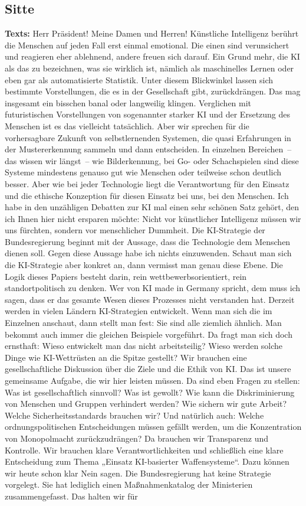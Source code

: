 \documentclass{article}
\begin{document}
\subsection{Sitte}
\noindent\textbf{Texts:} Herr Präsident! Meine Damen und Herren! Künstliche Intelligenz berührt die Menschen auf jeden Fall erst einmal emotional. Die einen sind verunsichert und reagieren eher ablehnend, andere freuen sich darauf. Ein Grund mehr, die KI als das zu bezeichnen, was sie wirklich ist, nämlich als maschinelles Lernen oder eben gar als automatisierte Statistik. Unter diesem Blickwinkel lassen sich bestimmte Vorstellungen, die es in der Gesellschaft gibt, zurückdrängen. Das mag insgesamt ein bisschen banal oder langweilig klingen. Verglichen mit futuristischen Vorstellungen von sogenannter starker KI und der Ersetzung des Menschen ist es das vielleicht tatsächlich. Aber wir sprechen für die vorhersagbare Zukunft von selbstlernenden Systemen, die quasi Erfahrungen in der Mustererkennung sammeln und dann entscheiden. In einzelnen Bereichen – das wissen wir längst – wie Bilderkennung, bei Go- oder Schachspielen sind diese Systeme mindestens genauso gut wie Menschen oder teilweise schon deutlich besser. Aber wie bei jeder Technologie liegt die Verantwortung für den Einsatz und die ethische Konzeption für diesen Einsatz bei uns, bei den Menschen.  Ich habe in den unzähligen Debatten zur KI mal einen sehr schönen Satz gehört, den ich Ihnen hier nicht ersparen möchte: Nicht vor künstlicher Intelligenz müssen wir uns fürchten, sondern vor menschlicher Dummheit.  Die KI-Strategie der Bundesregierung beginnt mit der Aussage, dass die Technologie dem Menschen dienen soll. Gegen diese Aussage habe ich nichts einzuwenden. Schaut man sich die KI-Strategie aber konkret an, dann vermisst man genau diese Ebene. Die Logik dieses Papiers besteht darin, rein wettbewerbsorientiert, rein standortpolitisch zu denken. Wer von KI made in Germany spricht, dem muss ich sagen, dass er das gesamte Wesen dieses Prozesses nicht verstanden hat.  Derzeit werden in vielen Ländern KI-Strategien entwickelt. Wenn man sich die im Einzelnen anschaut, dann stellt man fest: Sie sind alle ziemlich ähnlich. Man bekommt auch immer die gleichen Beispiele vorgeführt. Da fragt man sich doch ernsthaft: Wieso entwickelt man das nicht arbeitsteilig? Wieso werden solche Dinge wie KI-Wettrüsten an die Spitze gestellt? Wir brauchen eine gesellschaftliche Diskussion über die Ziele und die Ethik von KI. Das ist unsere gemeinsame Aufgabe, die wir hier leisten müssen. Da sind eben Fragen zu stellen: Was ist gesellschaftlich sinnvoll? Was ist gewollt? Wie kann die Diskriminierung von Menschen und Gruppen verhindert werden? Wie sichern wir gute Arbeit? Welche Sicherheitsstandards brauchen wir? Und natürlich auch: Welche ordnungspolitischen Entscheidungen müssen gefällt werden, um die Konzentration von Monopolmacht zurückzudrängen? Da brauchen wir Transparenz und Kontrolle. Wir brauchen klare Verantwortlichkeiten und schließlich eine klare Entscheidung zum Thema „Einsatz KI-basierter Waffensysteme“. Dazu können wir heute schon klar Nein sagen.  Die Bundesregierung hat keine Strategie vorgelegt. Sie hat lediglich einen Maßnahmenkatalog der Ministerien zusammengefasst. Das halten wir für 
\end{document}
